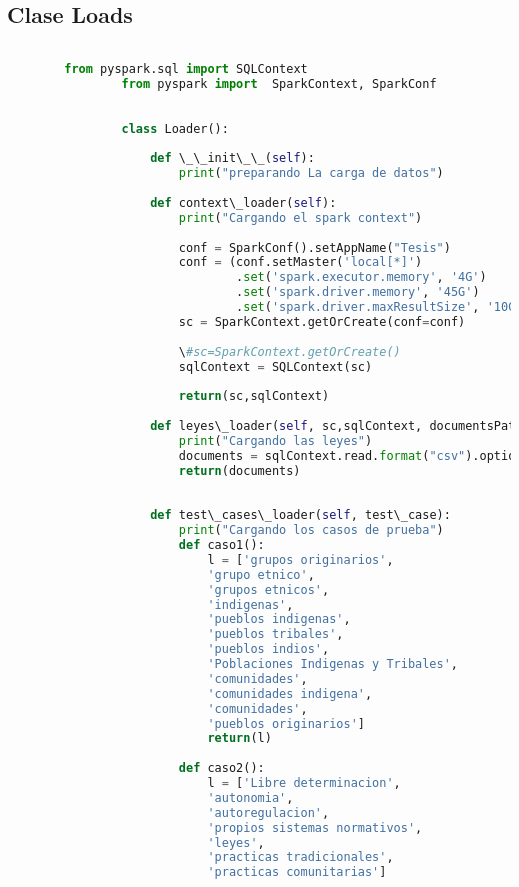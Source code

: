 \documentclass[12pt]{article}
\begin{document}
		\subsection{ Clase Loads}
		\begin{lstlisting}[language=Python, 
		caption= Clase loads,
		label={lst:claseLoads}]
		
		from pyspark.sql import SQLContext
				from pyspark import  SparkContext, SparkConf
				
				
				class Loader():
				    
				    def \_\_init\_\_(self):
				        print("preparando La carga de datos")
				        
				    def context\_loader(self):
				        print("Cargando el spark context")
				        
				        conf = SparkConf().setAppName("Tesis")
				        conf = (conf.setMaster('local[*]')
				                .set('spark.executor.memory', '4G')
				                .set('spark.driver.memory', '45G')
				                .set('spark.driver.maxResultSize', '10G'))
				        sc = SparkContext.getOrCreate(conf=conf)
				        
				        \#sc=SparkContext.getOrCreate()
				        sqlContext = SQLContext(sc)
				        
				        return(sc,sqlContext)
				    
				    def leyes\_loader(self, sc,sqlContext, documentsPath):
				        print("Cargando las leyes")
				        documents = sqlContext.read.format("csv").option("header", "true").load(documentsPath)
				        return(documents)
				
				    
				    def test\_cases\_loader(self, test\_case):
				        print("Cargando los casos de prueba")
				        def caso1():
				            l = ['grupos originarios',
				            'grupo etnico',
				            'grupos etnicos',
				            'indigenas',
				            'pueblos indigenas',
				            'pueblos tribales',
				            'pueblos indios',
				            'Poblaciones Indigenas y Tribales',
				            'comunidades',
				            'comunidades indigena',
				            'comunidades',
				            'pueblos originarios']
				            return(l)
				
				        def caso2():
				            l = ['Libre determinacion',
				            'autonomia',
				            'autoregulacion',
				            'propios sistemas normativos',
				            'leyes',
				            'practicas tradicionales',
				            'practicas comunitarias']
				

\end{lstlisting}
\end{document}
